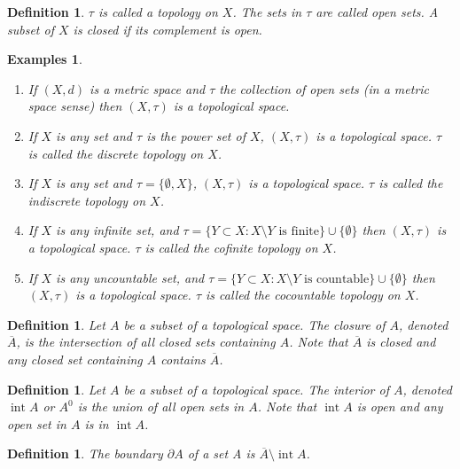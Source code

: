 \documentclass{notes}
\theoremstyle{plain}
\newtheorem{definition}[proposition]{Definition}
\newtheorem*{examples}{Examples}
\DeclareMathOperator{\inter}{int}
\begin{document}
\begin{definition}
  $\tau$ is called a topology on $X$.  The sets in
  $\tau$ are
called open sets.  A subset of $X$ is closed%
 if its complement is open.
\end{definition}

\begin{examples}
\begin{enumerate}
\item If $(X,d)$ is a metric space and $\tau$ the collection of open
  sets (in a metric space sense) then $(X,\tau)$ is a topological
  space.
\item If $X$ is any set and $\tau$ is the power set of $X$, $(X,\tau)$
  is a
topological space.  $\tau$ is called the discrete topology%
 on $X$.
\item If $X$ is any set and $\tau = \{ \emptyset, X \}$, $(X,\tau)$ is
  a
topological space.  $\tau$ is called the indiscrete topology%
 on $X$.
\item If $X$ is any infinite set, and $\tau = \{ Y \subset X: X
  \setminus Y \text{ is finite}\} \cup \{\emptyset\}$ then $(X,\tau)$
  is a topological space.
$\tau$ is called the cofinite topology%
 on $X$.
\item If $X$ is any uncountable set, and $\tau = \{ Y \subset X: X
  \setminus Y \text{ is countable}\} \cup \{\emptyset\}$ then
  $(X,\tau)$ is a topological
space.  $\tau$ is called the cocountable topology%
 on $X$.
\end{enumerate}
\end{examples}

\begin{definition}
Let $A$ be a subset of a topological space.  The closure%
 of $A$, %
denoted $\overline{A}$, is the intersection of all closed sets
containing $A$.  Note that $\overline{A}$ is closed and any closed set
containing $A$ contains $\overline{A}$.
\end{definition}

\begin{definition}
Let $A$ be a subset of a topological space.  The interior%
 of $A$, denoted $\inter A$ or $A^0$ is the union of
all open sets in $A$.  Note that $\inter A$ is open and any open set
in $A$ is in $\inter A$.
\end{definition}

\begin{definition}
  The boundary $\partial A$ of a set A is
  $\overline{A} \setminus \inter A$.
\end{definition}
\end{document}
